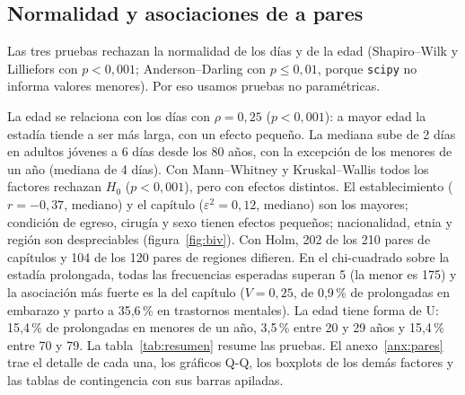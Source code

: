\documentclass[10.5pt,a4paper,headings=small,abstract=false,bibliography=totoc,listof=totoc]{scrartcl}
\newcommand{\pct}{\,\%}
\newcommand{\anexo}[1]{anexo~\ref{#1}}
\begin{document}
\subsection{Normalidad y asociaciones de a pares}

Las tres pruebas rechazan la normalidad de los días y de la edad (Shapiro--Wilk y Lilliefors con $p<0{,}001$; Anderson--Darling con $p\le0{,}01$, porque \texttt{scipy} no informa valores menores). Por eso usamos pruebas no paramétricas.

La edad se relaciona con los días con $\rho=0{,}25$ ($p<0{,}001$): a mayor edad la estadía tiende a ser más larga, con un efecto pequeño. La mediana sube de 2 días en adultos jóvenes a 6 días desde los 80 años, con la excepción de los menores de un año (mediana de 4 días). Con Mann--Whitney y Kruskal--Wallis todos los factores rechazan $H_0$ ($p<0{,}001$), pero con efectos distintos. El establecimiento ($r=-0{,}37$, mediano) y el capítulo ($\varepsilon^2=0{,}12$, mediano) son los mayores; condición de egreso, cirugía y sexo tienen efectos pequeños; nacionalidad, etnia y región son despreciables (figura~\ref{fig:biv}). Con Holm, 202 de los 210 pares de capítulos y 104 de los 120 pares de regiones difieren. En el chi-cuadrado sobre la estadía prolongada, todas las frecuencias esperadas superan 5 (la menor es 175) y la asociación más fuerte es la del capítulo ($V=0{,}25$, de 0,9\pct{} de prolongadas en embarazo y parto a 35,6\pct{} en trastornos mentales). La edad tiene forma de U: 15,4\pct{} de prolongadas en menores de un año, 3,5\pct{} entre 20 y 29 años y 15,4\pct{} entre 70 y 79. La tabla~\ref{tab:resumen} resume las pruebas. El \anexo{anx:pares} trae el detalle de cada una, los gráficos Q-Q, los boxplots de los demás factores y las tablas de contingencia con sus barras apiladas.
\end{document}
